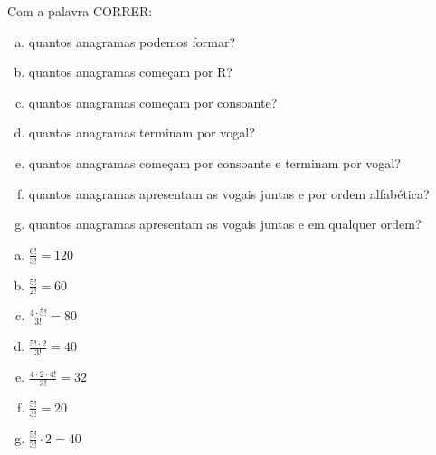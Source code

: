 \begin{ex}
Com a palavra CORRER:
   \begin{enumerate}[(a)]
   \item quantos anagramas podemos formar?
   \item quantos anagramas começam por R?
   \item quantos anagramas começam por consoante?
   \item quantos anagramas terminam por vogal?
   \item quantos anagramas começam por consoante e terminam por vogal?
   \item quantos anagramas apresentam as vogais juntas e por ordem alfabética?
   \item quantos anagramas apresentam as vogais juntas e em qualquer ordem?
   \end{enumerate}
     \begin{sol}
       \phantom{A} 
       \begin{enumerate} [(a)]
           \item $\frac{6!}{3!}=120$
           \item $\frac{5!}{2!}=60$
           \item $\frac{4\cdot5!}{3!}=80$
           \item $\frac{5!\cdot2}{3!}=40$
           \item $\frac{4\cdot2\cdot4!}{3!}=32$
           \item $\frac{5!}{3!}=20$
           \item $\frac{5!}{3!}\cdot2=40$
       \end{enumerate}
       
     \end{sol}
\end{ex}